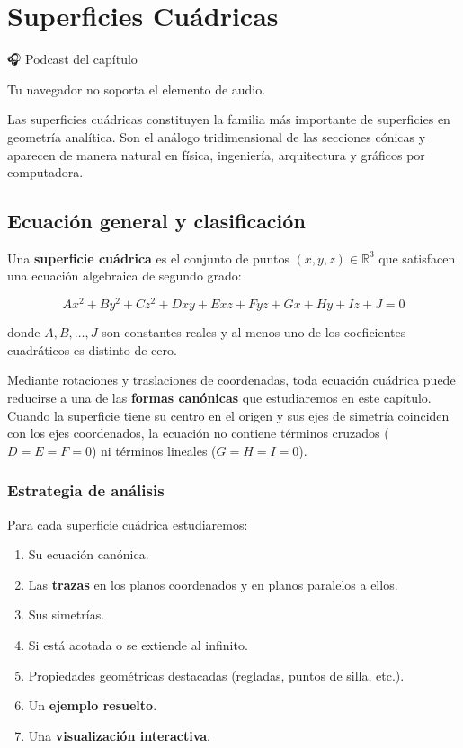 \documentclass[
]{book}
\providecommand{\tightlist}{%
  \setlength{\itemsep}{0pt}\setlength{\parskip}{0pt}}
\begin{document}
\chapter{Superficies Cuádricas}\label{cuadricas}

🎧 Podcast del capítulo

Tu navegador no soporta el elemento de audio.

Las superficies cuádricas constituyen la familia más importante de superficies en geometría analítica. Son el análogo tridimensional de las secciones cónicas y aparecen de manera natural en física, ingeniería, arquitectura y gráficos por computadora.

\section{Ecuación general y clasificación}\label{ecuaciuxf3n-general-y-clasificaciuxf3n}

Una \textbf{superficie cuádrica} es el conjunto de puntos \((x, y, z) \in \mathbb{R}^3\) que satisfacen una ecuación algebraica de segundo grado:

\[
Ax^2 + By^2 + Cz^2 + Dxy + Exz + Fyz + Gx + Hy + Iz + J = 0
\]

donde \(A, B, \dots, J\) son constantes reales y al menos uno de los coeficientes cuadráticos es distinto de cero.

Mediante rotaciones y traslaciones de coordenadas, toda ecuación cuádrica puede reducirse a una de las \textbf{formas canónicas} que estudiaremos en este capítulo. Cuando la superficie tiene su centro en el origen y sus ejes de simetría coinciden con los ejes coordenados, la ecuación no contiene términos cruzados (\(D = E = F = 0\)) ni términos lineales (\(G = H = I = 0\)).

\subsection{Estrategia de análisis}\label{estrategia-de-anuxe1lisis}

Para cada superficie cuádrica estudiaremos:

\begin{enumerate}
\def\labelenumi{\arabic{enumi}.}
\tightlist
\item
  Su ecuación canónica.
\item
  Las \textbf{trazas} en los planos coordenados y en planos paralelos a ellos.
\item
  Sus simetrías.
\item
  Si está acotada o se extiende al infinito.
\item
  Propiedades geométricas destacadas (regladas, puntos de silla, etc.).
\item
  Un \textbf{ejemplo resuelto}.
\item
  Una \textbf{visualización interactiva}.
\end{enumerate}
\end{document}
